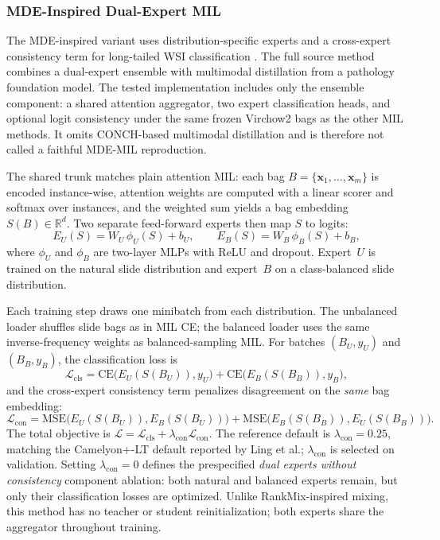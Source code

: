\documentclass[11pt]{article}
\begin{document}
\subsubsection{MDE-Inspired Dual-Expert MIL}
The MDE-inspired variant uses distribution-specific experts and a cross-expert consistency term for long-tailed WSI classification \citep{ling2025mdeMil}. The full source method combines a dual-expert ensemble with multimodal distillation from a pathology foundation model. The tested implementation includes only the ensemble component: a shared attention aggregator, two expert classification heads, and optional logit consistency under the same frozen Virchow2 bags as the other MIL methods. It omits CONCH-based multimodal distillation and is therefore not called a faithful MDE-MIL reproduction.

The shared trunk matches plain attention MIL: each bag $B=\{\mathbf{x}_1,\ldots,\mathbf{x}_m\}$ is encoded instance-wise, attention weights are computed with a linear scorer and softmax over instances, and the weighted sum yields a bag embedding $S(B)\in\mathbb{R}^{d}$. Two separate feed-forward experts then map $S$ to logits:
\begin{equation}
  E_U(S) = W_U\,\phi_U(S) + b_U,
  \qquad
  E_B(S) = W_B\,\phi_B(S) + b_B,
  \label{eq:mde-experts}
\end{equation}
\noindent where $\phi_U$ and $\phi_B$ are two-layer MLPs with ReLU and dropout. Expert~$U$ is trained on the natural slide distribution and expert~$B$ on a class-balanced slide distribution.

Each training step draws one minibatch from each distribution. The unbalanced loader shuffles slide bags as in MIL CE; the balanced loader uses the same inverse-frequency weights as balanced-sampling MIL. For batches $(B_U,y_U)$ and $(B_B,y_B)$, the classification loss is
\begin{equation}
  \mathcal{L}_{\mathrm{cls}} =
  \mathrm{CE}\bigl(E_U(S(B_U)), y_U\bigr) +
  \mathrm{CE}\bigl(E_B(S(B_B)), y_B\bigr),
  \label{eq:mde-cls}
\end{equation}
\noindent and the cross-expert consistency term penalizes disagreement on the \emph{same} bag embedding:
\begin{equation}
  \mathcal{L}_{\mathrm{con}} =
  \mathrm{MSE}\bigl(E_U(S(B_U)), E_B(S(B_U))\bigr) +
  \mathrm{MSE}\bigl(E_B(S(B_B)), E_U(S(B_B))\bigr).
  \label{eq:mde-con}
\end{equation}
\noindent The total objective is $\mathcal{L}=\mathcal{L}_{\mathrm{cls}}+\lambda_{\mathrm{con}}\mathcal{L}_{\mathrm{con}}$. The reference default is $\lambda_{\mathrm{con}}=\num{0.25}$, matching the Camelyon+-LT default reported by Ling et al.; $\lambda_{\mathrm{con}}$ is selected on validation. Setting $\lambda_{\mathrm{con}}=0$ defines the prespecified \emph{dual experts without consistency} component ablation: both natural and balanced experts remain, but only their classification losses are optimized. Unlike RankMix-inspired mixing, this method has no teacher or student reinitialization; both experts share the aggregator throughout training.
\end{document}
